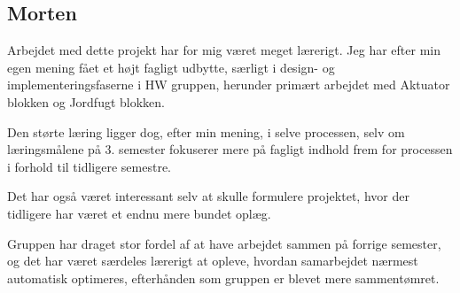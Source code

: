 \subsection{Morten}

Arbejdet med dette projekt har for mig været meget lærerigt. 
Jeg har efter min egen mening fået et højt fagligt udbytte, særligt i design- og implementeringsfaserne i HW gruppen, herunder primært arbejdet med Aktuator blokken og Jordfugt blokken. 

Den størte læring ligger dog, efter min mening, i selve processen, selv om læringsmålene på 3. semester fokuserer mere på fagligt indhold frem for processen i forhold til tidligere semestre.

Det har også været interessant selv at skulle formulere projektet, hvor der tidligere har været et endnu mere bundet oplæg. 

Gruppen har draget stor fordel af at have arbejdet sammen på forrige semester, og det har været særdeles lærerigt at opleve, hvordan samarbejdet nærmest automatisk optimeres, efterhånden som gruppen er blevet mere sammentømret.